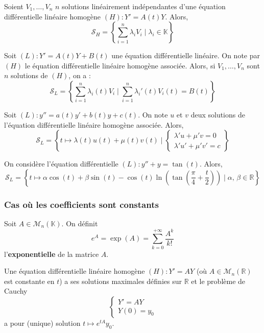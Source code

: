   \begin{proposition}
    Soient $V_1, \dots, V_n$ $n$ solutions linéairement indépendantes d'une équation différentielle linéaire homogène $(H) : Y' = A(t) Y$. Alors,
    \[ \mathcal{S}_H = \left\{\sum_{i=1}^n \lambda_i V_i \mid \lambda_i \in \mathbb{K} \right\} \]
  \end{proposition}

  \begin{corollary}
    Soit $(L) : Y' = A(t) Y + B(t)$ une équation différentielle linéaire. On note par $(H)$ le équation différentielle linéaire homogène associée. Alors, si $V_1, \dots, V_n$ sont $n$ solutions de $(H)$, on a :
    \[ \mathcal{S}_L = \left\{\sum_{i=1}^n \lambda_i(t) V_i \mid \sum_{i=1}^n \lambda_i'(t) V_i(t) = B(t)\right\} \]
  \end{corollary}

  \begin{example}
    Soit $(L) : y'' = a(t) y' + b(t)y + c(t)$. On note $u$ et $v$ deux solutions de l'équation différentielle linéaire homogène associée. Alors,
    \[ \mathcal{S}_L = \left\{t \mapsto \lambda(t) u(t) + \mu(t) v(t) \mid \begin{cases} \lambda'u + \mu'v = 0 \\ \lambda' u' + \mu' v' = c \end{cases} \right\} \]
  \end{example}

  \begin{example}
    On considère l'équation différentielle $(L) : y'' + y = \tan(t)$. Alors,
    \[ \mathcal{S}_L = \left\{t \mapsto \alpha \cos(t) + \beta \sin(t) - \cos(t) \ln \left( \tan \left( \frac{\pi}{4} + \frac{t}{2} \right) \right) \mid \alpha, \, \beta \in \mathbb{R} \right\} \]
  \end{example}

  \subsubsection{Cas où les coefficients sont constants}

  \begin{definition}
    Soit $A \in \mathcal{M}_n(\mathbb{K})$. On définit
    \[ e^{A} = \exp(A) = \sum_{k=0}^{+\infty} \frac{A^k}{k!} \]
    l'\textbf{exponentielle} de la matrice $A$.
  \end{definition}

  \begin{proposition}
    Une équation différentielle linéaire homogène $(H) : Y' = AY$ (où $A \in \mathcal{M}_n(\mathbb{R})$ est constante en $t$) a ses solutions maximales définies sur $\mathbb{R}$ et le problème de Cauchy
    \[ \begin{cases} Y' = AY \\ Y(0) = y_0 \end{cases} \]
    a pour (unique) solution $t \mapsto e^{tA} y_0$.
  \end{proposition}

